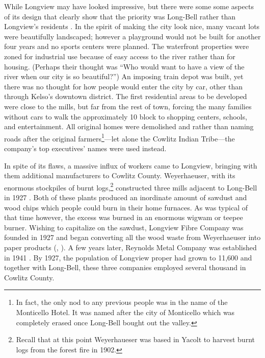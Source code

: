 While Longview may have looked impressive, but there were some some aspects of its design that clearly show that the priority was Long-Bell rather than Longview's residents \citep[28--30]{mcclelland_1976}. In the spirit of making the city look nice, many vacant lots were beautifully landscaped; however a playground would not be built for another four years and no sports centers were planned. The waterfront properties were zoned for industrial use because of easy access to the river rather than for housing. (Perhaps their thought was ``Who would want to have a view of the river when our city is so beautiful?'') An imposing train depot was built, yet there was no thought for how people would enter the city by car, other than through Kelso's downtown district. The first residential areas to be developed were close to the mills, but far from the rest of town, forcing the many families without cars to walk the approximately 10 block to shopping centers, schools, and entertainment. All original homes were demolished and rather than naming roads after the original farmers\footnote{In fact, the only nod to any previous people was in the name of the Monticello Hotel. It was named after the city of Monticello which was completely erased once Long-Bell bought out the valley.}---let alone the Cowlitz Indian Tribe---the company's top executives' names were used instead.

In spite of its flaws, a massive influx of workers came to Longview, bringing with them additional manufacturers to Cowlitz County. Weyerhaeuser, with its enormous stockpiles of burnt logs,\footnote{Recall that at this point Weyerhaueser was based in Yacolt to harvest burnt logs from the forest fire in 1902.} constructed three mills adjacent to Long-Bell in 1927 \citep[161-162]{urrutia_1998}. Both of these plants produced an inordinate amount of sawdust and wood chips  which people could burn in their home furnaces. As was typical of that time however, the excess was burned in an enormous wigwam or teepee burner. Wishing to capitalize on the sawdust, Longview Fibre Company was founded in 1927 and began converting all the wood waste from Weyerhaeuser into paper products (\citealt[164--165]{urrutia_1998}, \citealt[11-13]{olson_1948}). A few years later, Reynolds Metal Company was established in 1941 \citep[175]{urrutia_1998}. By 1927, the population of Longview proper had grown to 11,600 \citep[36]{wilma_2017} and together with Long-Bell, these three companies employed several thousand in Cowlitz County.

